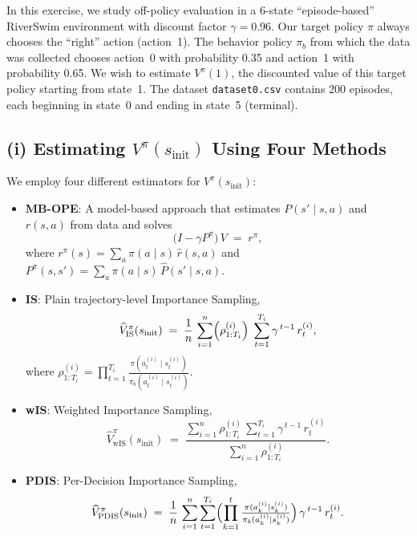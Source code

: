 In this exercise, we study off-policy evaluation in a 6-state ``episode-based'' RiverSwim environment with discount factor $\gamma = 0.96$. Our target policy $\pi$ always chooses the ``right'' action (action~1). The behavior policy $\pi_b$ from which the data was collected chooses action~0 with probability 0.35 and action~1 with probability 0.65. We wish to estimate $V^\pi(1)$, the discounted value of this target policy starting from state~1. The dataset \texttt{dataset0.csv} contains 200 episodes, each beginning in state~0 and ending in state~5 (terminal).

\subsection*{(i) Estimating $V^\pi(s_{\text{init}})$ Using Four Methods}
We employ four different estimators for $V^\pi(s_{\text{init}})$:
\begin{itemize}
    \item \textbf{MB-OPE}: A model-based approach that estimates $P(s' \mid s,a)$ and $r(s,a)$ from data and solves
    \[
        \bigl(I - \gamma P^\pi \bigr)\,V \;=\; r^\pi,
    \]
    where $r^\pi(s) = \sum_a \pi(a \mid s)\,\hat{r}(s,a)$ and $P^\pi(s,s') = \sum_a \pi(a \mid s)\,\hat{P}(s' \mid s,a)$.
    \item \textbf{IS}: Plain trajectory-level Importance Sampling,
    \[
        \widehat{V}^\pi_{\mathrm{IS}}(s_{\text{init}}) \;=\; \frac{1}{n}\,\sum_{i=1}^n \Bigl(\rho_{1:T_i}^{(i)}\Bigr)\;\sum_{t=1}^{T_i} \gamma^{\,t-1}\,r_t^{(i)},
    \]
    where $\rho_{1:T_i}^{(i)} = \prod_{t=1}^{T_i} \frac{\pi(a_t^{(i)} \mid s_t^{(i)})}{\pi_b(a_t^{(i)} \mid s_t^{(i)})}$.
    \item \textbf{wIS}: Weighted Importance Sampling,
    \[
        \widehat{V}^\pi_{\mathrm{wIS}}(s_{\text{init}}) \;=\; \frac{\sum_{i=1}^n \rho_{1:T_i}^{(i)} \,\sum_{t=1}^{T_i} \gamma^{\,t-1}\,r_t^{(i)}}{\sum_{i=1}^n \rho_{1:T_i}^{(i)}}.
    \]
    \item \textbf{PDIS}: Per-Decision Importance Sampling,
    \[
        \widehat{V}^\pi_{\mathrm{PDIS}}(s_{\text{init}}) \;=\; \frac{1}{n}\,\sum_{i=1}^n \sum_{t=1}^{T_i} \Bigl(\prod_{k=1}^t \tfrac{\pi(a_k^{(i)} \mid s_k^{(i)})}{\pi_b(a_k^{(i)} \mid s_k^{(i)})}\Bigr)\,\gamma^{\,t-1}\,r_t^{(i)}.
    \]
\end{itemize}

